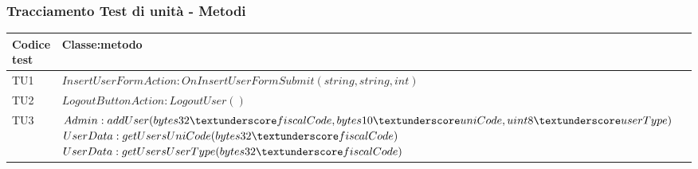 \subsubsection{Tracciamento Test di unità - Metodi}
\normalsize
\begin{longtable}{|>{\centering\arraybackslash}p{2cm}| p{15cm}|}
	\hline
	\textbf{Codice test} & \textbf{Classe:metodo} \\
	\hline
	\endhead
	TU1 & $InsertUserFormAction:OnInsertUserFormSubmit(string,string,int)$ \\
	\hline
	TU2 & $LogoutButtonAction:LogoutUser()$ \\
	\hline
	TU3 & $Admin:addUser(bytes32 \textunderscore fiscalCode, bytes10 \textunderscore uniCode, uint8 \textunderscore userType)$\newline$UserData:getUsersUniCode(bytes32 \textunderscore fiscalCode)$\newline$UserData:getUsersUserType(bytes32 \textunderscore fiscalCode)$
	\\
	\hline


\end{longtable}
